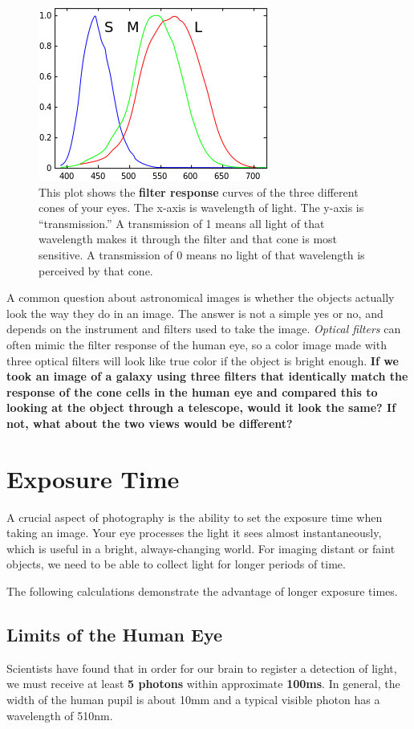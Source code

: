 \documentclass[10pt]{article}%
\begin{document}
\begin{figure}[h]
\center
\includegraphics[scale=0.6]{cones.png}
\caption{This plot shows the \textbf{filter response} curves of the three different cones of your eyes. The x-axis is wavelength of light. The y-axis is ``transmission.''  A transmission of 1 means all light of that wavelength makes it through the filter and that cone is most sensitive. A transmission of 0 means no light of that wavelength is perceived by that cone.  \label{cones.fig}}
\end{figure}

A common question about astronomical images is whether the objects actually look the way they do in an image. The answer is not a simple yes or no, and depends on the instrument and filters used to take the image. \textit{Optical filters} can often mimic the filter response of the human eye, so a color image made with three optical filters will look like true color if the object is bright enough. \textbf{If we took an image of a galaxy using three filters that identically match the response of the cone cells in the human eye and compared this to looking at the object through a telescope, would it look the same? If not, what about the two views would be different?}

\section{Exposure Time}
A crucial aspect of photography is the ability to set the exposure time when taking an image. Your eye processes the light it sees almost instantaneously, which is useful in a bright, always-changing world. For imaging distant or faint objects, we need to be able to collect light for longer periods of time.

The following calculations demonstrate the advantage of longer exposure times. 

\subsection{Limits of the Human Eye}
Scientists have found that in order for our brain to register a detection of light, we must receive at least \textbf{5 photons} within approximate \textbf{100ms}.  In general, the width of the human pupil is about 10mm and a typical visible photon has a wavelength of 510nm. 
\end{document}
